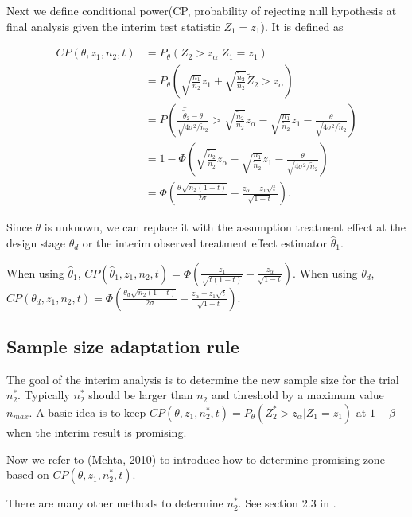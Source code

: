 \documentclass[12pt]{article}
\begin{document}
Next we define conditional power(CP, probability of rejecting null
hypothesis at final analysis given the interim test statistic
$Z_1=z_1$). It is defined as

\begin{align*} CP(\theta, z_1, n_2, t) &= P_{\theta}(Z_2 > z_{\alpha}
| Z_1 = z_1) \\ &= P_{\theta}\left(\sqrt{\frac{n_1}{n_2}} z_1 +
\sqrt{\frac{\tilde{n}_2}{n_2}} \tilde{Z}_2 > z_{\alpha}\right) \\ &=
P\left(\frac{\hat{\tilde{\theta}}_2 - \theta}{\sqrt{4\sigma^2 /
\tilde{n}_2}} > \sqrt{\frac{\tilde{n}_2}{n_2}} z_{\alpha} -
\sqrt{\frac{n_1}{\tilde{n}_2}} z_1 - \frac{\theta}{\sqrt{4\sigma^2 /
\tilde{n}_2}}\right) \\ &= 1 -
\Phi\left(\sqrt{\frac{\tilde{n}_2}{n_2}} z_{\alpha} -
\sqrt{\frac{n_1}{\tilde{n}_2}} z_1 - \frac{\theta}{\sqrt{4\sigma^2 /
\tilde{n}_2}}\right) \\ &= \Phi\left(\frac{\theta
\sqrt{n_2(1-t)}}{2\sigma} - \frac{z_{\alpha} - z_1
\sqrt{t}}{\sqrt{1-t}}\right).
\end{align*}

Since $\theta$ is unknown, we can replace it with the assumption
treatment effect at the design stage $\theta_d$ or the interim
observed treatment effect estimator $\hat{\theta}_1$.

When using $\hat{\theta}_1$, $CP(\hat{\theta}_1, z_1, n_2,
t)=\Phi\left( \frac{z_1}{\sqrt{t(1-t)}} -
\frac{z_{\alpha}}{\sqrt{1-t}}\right)$. When using $\theta_d$,
$CP(\theta_d, z_1, n_2, t)=\Phi\left( \frac{\theta_d
\sqrt{n_2(1-t)}}{2\sigma} - \frac{z_{\alpha}-z_1
\sqrt{t}}{\sqrt{1-t}}\right)$.

\subsection{Sample size adaptation rule}

The goal of the interim analysis is to determine the new sample size
for the trial $n_{2}^{*}$. Typically $n_{2}^{*}$ should be larger than
$n_2$ and threshold by a maximum value $n_{max}$. A basic idea is to
keep $CP(\theta, z_1, n_{2}^{*}, t)=P_{\theta}(Z_{2}^{*} > z_{\alpha}
| Z_1 = z_1)$ at $1-\beta$ when the interim result is promising.


Now we refer to (Mehta, 2010) to introduce how to determine promising
zone based on $CP(\theta, z_1, n_{2}^{*}, t)$.

There are many other methods to determine $n_{2}^{*}$. See section 2.3
in \citep{Liu2021review}.








\end{document}
